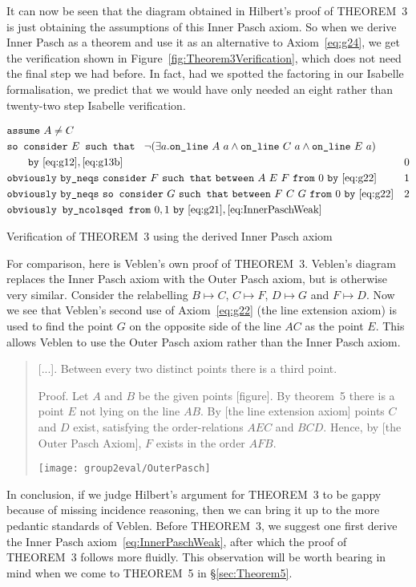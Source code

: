 It can now be seen that the diagram obtained in Hilbert's proof of THEOREM~3 is just obtaining the assumptions of this Inner Pasch axiom. So when we derive Inner Pasch as a theorem and use it as an alternative to Axiom~\ref{eq:g24}, we get the verification shown in Figure~\ref{fig:Theorem3Verification}, which does not need the final step we had before. In fact, had we spotted the factoring in our Isabelle formalisation, we predict that we would have only needed an eight rather than twenty-two step Isabelle verification.

\begin{boxedfigure}
\begin{align*}
  &\code{assume}\ A\neq C\\
  &\code{so consider}\ E \code{ such that }\ \Triangle{a}{A}{C}{E}\\
  &\qquad\code{by}\ \eqref{eq:g12},\eqref{eq:g13b}& 0\\
  &\code{obviously}\ \code{by\_neqs}\ \code{consider}\ F\ \code{such that}\ \between{A}{E}{F}\ \code{from}\ 0\ \code{by}\ \eqref{eq:g22} & 1\\
  &\code{obviously}\ \code{by\_neqs}\ \code{so consider}\ G\ \code{such that}\ \between{F}{C}{G}\ \code{from}\ 0\ \code{by}\ \eqref{eq:g22} & 2\\
  &\code{obviously by\_ncols} \code{qed from}\ 0,1\ \code{by}\ \eqref{eq:g21},\eqref{eq:InnerPaschWeak}
\end{align*}
\caption{Verification of THEOREM~3 using the derived Inner Pasch axiom}
\label{fig:Theorem3Verification}
\end{boxedfigure}

For comparison, here is Veblen's own proof of THEOREM~3. Veblen's diagram replaces the Inner Pasch axiom with the Outer Pasch axiom, but is otherwise very similar. Consider the relabelling $B \mapsto C$, $C \mapsto F$, $D \mapsto G$ and $F \mapsto D$. Now we see that Veblen's second use of Axiom~\ref{eq:g22} (the line extension axiom) is used to find the point $G$ on the opposite side of the line $AC$ as the point $E$. This allows Veblen to use the Outer Pasch axiom rather than the Inner Pasch axiom.

\begin{quotation}\label{sec:VeblenThree}
[...]. Between every two distinct points there is a third point.

Proof. Let $A$ and $B$ be the given points [figure]. By theorem~5 there is a point $E$ not lying on the line $AB$. By [the line extension axiom] points $C$ and $D$ exist, satisfying the order-relations $AEC$ and $BCD$. Hence, by [the Outer Pasch Axiom], $F$ exists in the order $AFB$.
\vspace{0.5cm}

\centering\texttt{[image: group2eval/OuterPasch]}
\end{quotation}
In conclusion, if we judge Hilbert's argument for THEOREM~3 to be gappy because of missing incidence reasoning, then we can bring it up to the more pedantic standards of Veblen. Before THEOREM~3, we suggest one first derive the Inner Pasch axiom~\eqref{eq:InnerPaschWeak}, after which the proof of THEOREM~3 follows more fluidly. This observation will be worth bearing in mind when we come to THEOREM~5 in \S\ref{sec:Theorem5}.

